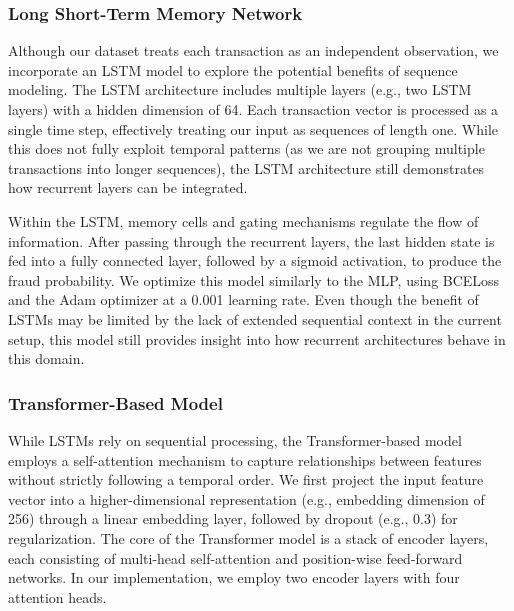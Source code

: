 \documentclass[11pt, oneside]{article}   	%
\begin{document}
\subsubsection{Long Short-Term Memory Network}

Although our dataset treats each transaction as an independent observation, we incorporate an LSTM model to explore the potential benefits of sequence modeling. The LSTM architecture includes multiple layers (e.g., two LSTM layers) with a hidden dimension of 64. Each transaction vector is processed as a single time step, effectively treating our input as sequences of length one. While this does not fully exploit temporal patterns (as we are not grouping multiple transactions into longer sequences), the LSTM architecture still demonstrates how recurrent layers can be integrated.

Within the LSTM, memory cells and gating mechanisms regulate the flow of information. After passing through the recurrent layers, the last hidden state is fed into a fully connected layer, followed by a sigmoid activation, to produce the fraud probability. We optimize this model similarly to the MLP, using BCELoss and the Adam optimizer at a 0.001 learning rate. Even though the benefit of LSTMs may be limited by the lack of extended sequential context in the current setup, this model still provides insight into how recurrent architectures behave in this domain.

\subsubsection{Transformer-Based Model}

While LSTMs rely on sequential processing, the Transformer-based model employs a self-attention mechanism to capture relationships between features without strictly following a temporal order. We first project the input feature vector into a higher-dimensional representation (e.g., embedding dimension of 256) through a linear embedding layer, followed by dropout (e.g., 0.3) for regularization. The core of the Transformer model is a stack of encoder layers, each consisting of multi-head self-attention and position-wise feed-forward networks. In our implementation, we employ two encoder layers with four attention heads.
\end{document}
